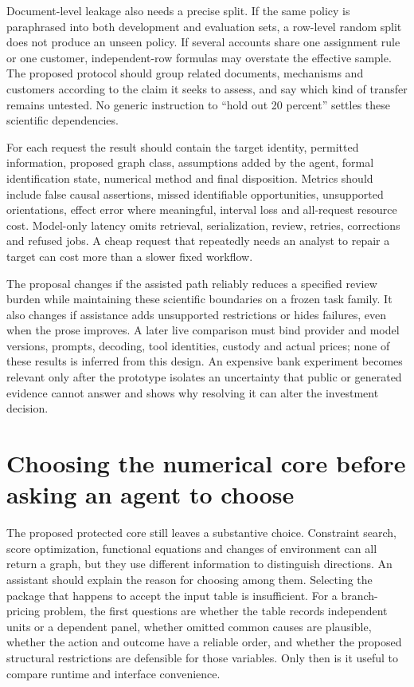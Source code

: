 Document-level leakage also needs a precise split. If the same policy is
paraphrased into both development and evaluation sets, a row-level random split
does not produce an unseen policy. If several accounts share one assignment
rule or one customer, independent-row formulas may overstate the effective
sample. The proposed protocol should group related documents, mechanisms and
customers according to the claim it seeks to assess, and say which kind of
transfer remains untested. No generic instruction to ``hold out 20 percent''
settles these scientific dependencies.

For each request the result should contain the target identity, permitted
information, proposed graph class, assumptions added by the agent, formal
identification state, numerical method and final disposition. Metrics should
include false causal assertions, missed identifiable opportunities, unsupported
orientations, effect error where meaningful, interval loss and all-request
resource cost. Model-only latency omits retrieval, serialization, review,
retries, corrections and refused jobs. A cheap request that repeatedly needs an
analyst to repair a target can cost more than a slower fixed workflow.

The proposal changes if the assisted path reliably reduces a specified review
burden while maintaining these scientific boundaries on a frozen task family.
It also changes if assistance adds unsupported restrictions or hides failures,
even when the prose improves. A later live comparison must bind provider and
model versions, prompts, decoding, tool identities, custody and actual prices;
none of these results is inferred from this design. An expensive bank experiment
becomes relevant only after the prototype isolates an uncertainty that public
or generated evidence cannot answer and shows why resolving it can alter the
investment decision.
\label{exec14:l4-development-end}


\section{Choosing the numerical core before asking an agent to choose}
\label{exec14:l4-alternatives}

The proposed protected core still leaves a substantive choice. Constraint
search, score optimization, functional equations and changes of environment
can all return a graph, but they use different information to distinguish
directions. An assistant should explain the reason for choosing among them.
Selecting the package that happens to accept the input table is insufficient.
For a branch-pricing problem, the first questions are whether the table records
independent units or a dependent panel, whether omitted common causes are
plausible, whether the action and outcome have a reliable order, and whether
the proposed structural restrictions are defensible for those variables.
Only then is it useful to compare runtime and interface convenience.

